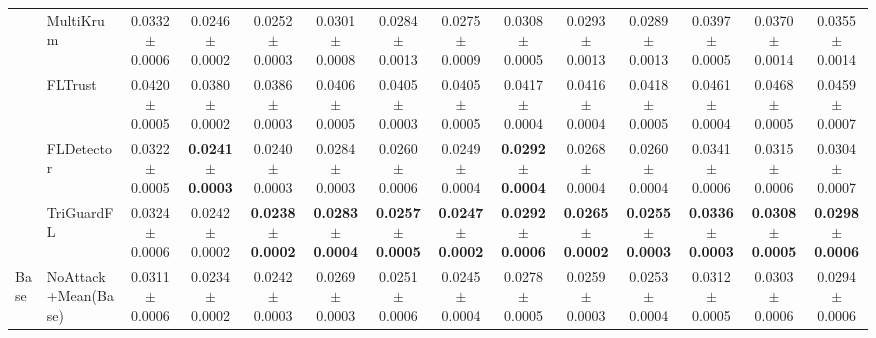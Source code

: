 \begin{table}[t]
\begin{tabular}{l l c c c c c c c c c c c c}
 & MultiKrum & 0.0332$\pm$0.0006 & 0.0246$\pm$0.0002 & 0.0252$\pm$0.0003 & 0.0301$\pm$0.0008 & 0.0284$\pm$0.0013 & 0.0275$\pm$0.0009 & 0.0308$\pm$0.0005 & 0.0293$\pm$0.0013 & 0.0289$\pm$0.0013 & 0.0397$\pm$0.0005 & 0.0370$\pm$0.0014 & 0.0355$\pm$0.0014 \\
 & FLTrust & 0.0420$\pm$0.0005 & 0.0380$\pm$0.0002 & 0.0386$\pm$0.0003 & 0.0406$\pm$0.0005 & 0.0405$\pm$0.0003 & 0.0405$\pm$0.0005 & 0.0417$\pm$0.0004 & 0.0416$\pm$0.0004 & 0.0418$\pm$0.0005 & 0.0461$\pm$0.0004 & 0.0468$\pm$0.0005 & 0.0459$\pm$0.0007 \\
 & FLDetector & 0.0322$\pm$0.0005 & \textbf{0.0241$\pm$0.0003} & 0.0240$\pm$0.0003 & 0.0284$\pm$0.0003 & 0.0260$\pm$0.0006 & 0.0249$\pm$0.0004 & \textbf{0.0292$\pm$0.0004} & 0.0268$\pm$0.0004 & 0.0260$\pm$0.0004 & 0.0341$\pm$0.0006 & 0.0315$\pm$0.0006 & 0.0304$\pm$0.0007 \\
 & TriGuardFL & 0.0324$\pm$0.0006 & 0.0242$\pm$0.0002 & \textbf{0.0238$\pm$0.0002} & \textbf{0.0283$\pm$0.0004} & \textbf{0.0257$\pm$0.0005} & \textbf{0.0247$\pm$0.0002} & \textbf{0.0292$\pm$0.0006} & \textbf{0.0265$\pm$0.0002} & \textbf{0.0255$\pm$0.0003} & \textbf{0.0336$\pm$0.0003} & \textbf{0.0308$\pm$0.0005} & \textbf{0.0298$\pm$0.0006} \\
\midrule
Base & NoAttack+Mean(Base) & 0.0311$\pm$0.0006 & 0.0234$\pm$0.0002 & 0.0242$\pm$0.0003 & 0.0269$\pm$0.0003 & 0.0251$\pm$0.0006 & 0.0245$\pm$0.0004 & 0.0278$\pm$0.0005 & 0.0259$\pm$0.0003 & 0.0253$\pm$0.0004 & 0.0312$\pm$0.0005 & 0.0303$\pm$0.0006 & 0.0294$\pm$0.0006 \\
\bottomrule
\end{tabular}
\end{table}
